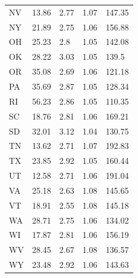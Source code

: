 \documentclass{article}
\begin{document}
\begin{table}
\begin{tabular}{p{1in}p{1in}p{1in}p{1in}p{1in}}
	NV    & 13.86                       & 2.77                 & 1.07         & 147.35                    \\
	NY    & 21.89                       & 2.75                 & 1.06         & 156.88                    \\
	OH    & 25.23                       & 2.8                  & 1.05         & 142.08                    \\
	OK    & 28.22                       & 3.03                 & 1.05         & 139.5                     \\
	OR    & 35.08                       & 2.69                 & 1.06         & 121.18                    \\
	PA    & 35.69                       & 2.87                 & 1.05         & 128.34                    \\
	RI    & 56.23                       & 2.86                 & 1.05         & 110.35                    \\
	SC    & 18.76                       & 2.81                 & 1.06         & 169.21                    \\
	SD    & 32.01                       & 3.12                 & 1.04         & 130.75                    \\
	TN    & 13.62                       & 2.71                 & 1.07         & 192.83                    \\
	TX    & 23.85                       & 2.92                 & 1.05         & 160.44                    \\
	UT    & 12.58                       & 2.71                 & 1.06         & 191.04                    \\
	VA    & 25.18                       & 2.63                 & 1.08         & 145.65                    \\
	VT    & 18.91                       & 2.55                 & 1.08         & 145.18                    \\
	WA    & 28.71                       & 2.75                 & 1.06         & 134.02                    \\
	WI    & 17.87                       & 2.81                 & 1.06         & 156.19                    \\
	WV    & 28.45                       & 2.67                 & 1.08         & 136.57                    \\
	WY    & 23.48                       & 2.92                 & 1.06         & 143.63                    \\
	\bottomrule
\end{tabular}
\end{table}
\restoregeometry
\end{document}

